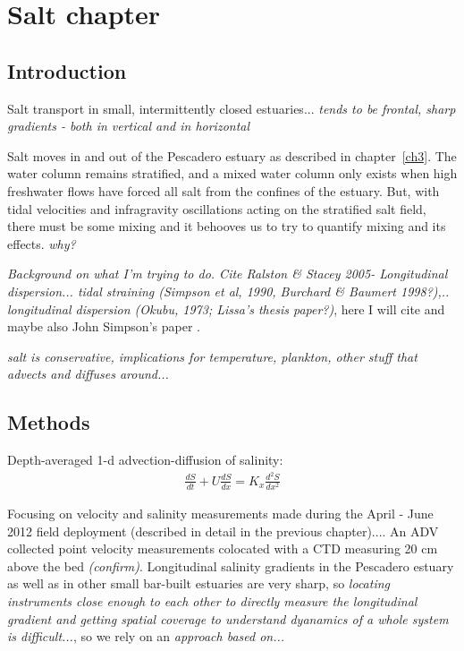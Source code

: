 \chapter{Salt chapter}
\label{chSalt}


\section{Introduction}
Salt transport in small, intermittently closed estuaries... \emph{tends to be frontal, sharp gradients - both in vertical and in horizontal}

Salt moves in and out of the Pescadero estuary as described in chapter~\ref{ch3}. The water column remains stratified, and a mixed water column only exists when high freshwater flows have forced all salt from the confines of the estuary. But, with tidal velocities and infragravity oscillations acting on the stratified salt field, there must be some mixing and it behooves us to try to quantify mixing and its effects. \emph{why?}



\emph{Background on what I'm trying to do.  Cite Ralston \& Stacey 2005- Longitudinal dispersion... tidal straining (Simpson et al, 1990, Burchard \& Baumert 1998?),.. longitudinal dispersion (Okubu, 1973; Lissa's thesis paper?)}, here I will cite \parencite{Ralston:2005aa} and maybe also John Simpson's paper \parencite{Simpson:1990aa}. 

\emph{salt is conservative, implications for temperature, plankton, other stuff that advects and diffuses around...}



\section{Methods}

Depth-averaged 1-d advection-diffusion of salinity:
\begin{eqnarray}
\frac{dS}{dt} + U\frac{dS}{dx} = K_x\frac{d^2S}{dx^2} \label{eq:1dadvdiff}
\end{eqnarray}


Focusing on velocity and salinity measurements made during the April - June 2012 field deployment (described in detail in the previous chapter).... An ADV collected point velocity measurements colocated with a CTD measuring 20 cm above the bed \emph{(confirm)}. Longitudinal salinity gradients in the Pescadero estuary as well as in other small bar-built estuaries are very sharp, so \emph{locating instruments close enough to each other to directly measure the longitudinal gradient and getting spatial coverage to understand dyanamics of a whole system is difficult...}, so we rely on an \emph{approach based on...}


